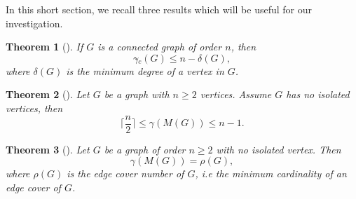 \documentclass[a4paper,12pt, reqno]{amsart}
\newtheorem{Theorem}{Theorem}[section]
\newtheorem{Lemma}[Theorem]{Lemma}
\begin{document}
In this short section, we recall three results which will be useful for our investigation.
\begin{Theorem}[\cite{ocds}]\label{outGwithdelta} 
	If $G$ is a connected graph of order $n$, then
	$$\gamma{\tilde{}} _{c}(G)\le n-\delta(G),$$
	where $\delta(G)$ is the minimum degree of a vertex in $G$.
\end{Theorem}
\begin{Theorem}[\cite{DSFBME}]\label{theo:mindominconnectgraph}
	Let $G$ be a graph with $n\ge2$ vertices. Assume $G$ has no isolated vertices, then 
	$$\lceil\frac{n}{2}\rceil\le\gamma(M(G))\le n-1.$$
\end{Theorem}
\begin{Theorem}[\cite{DSFBME}]\label{covernumber}
	Let $G$ be a graph of order $n\geq 2$ with no isolated vertex. Then $$\gamma(M(G))= \rho(G),$$
	where $\rho(G)$ is the edge cover number of $G$, i.e the minimum cardinality of an edge cover of $G$.
\end{Theorem}
\end{document}
